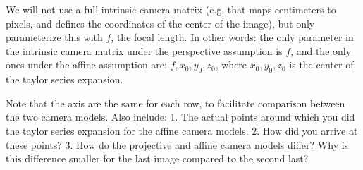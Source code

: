 \documentclass[11pt]{article}
\begin{document}
We will not use a full intrinsic camera matrix (e.g. that maps
centimeters to pixels, and defines the coordinates of the center of the
image), but only parameterize this with \(f\), the focal length. In
other words: the only parameter in the intrinsic camera matrix under the
perspective assumption is \(f\), and the only ones under the affine
assumption are: \(f,x_0,y_0,z_0\), where \(x_0,y_0,z_0\) is the center
of the taylor series expansion.

Note that the axis are the same for each row, to facilitate comparison
between the two camera models. Also include: 1. The actual points around
which you did the taylor series expansion for the affine camera models.
2. How did you arrive at these points? 3. How do the projective and
affine camera models differ? Why is this difference smaller for the last
image compared to the second last?
\end{document}
